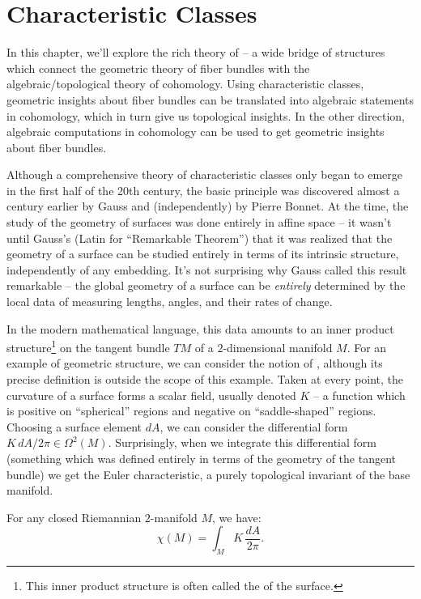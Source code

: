 \chapter{Characteristic Classes}\label{chapter:characteristic_classes}

In this chapter, we'll explore the rich theory of  -- a wide bridge of structures which connect the geometric theory of fiber bundles with the algebraic/topological theory of cohomology.
Using characteristic classes, geometric insights about fiber bundles can be translated into algebraic statements in cohomology, which in turn give us topological insights. In the other direction, algebraic computations in cohomology can be used to get geometric insights about fiber bundles.

Although a comprehensive theory of characteristic classes only began to emerge in the first half of the 20th century, the basic principle was discovered almost a century earlier by Gauss and (independently) by Pierre Bonnet. At the time, the study of the geometry of surfaces was done entirely in affine space -- it wasn't until Gauss's  (Latin for ``Remarkable Theorem'') that it was realized that the geometry of a surface can be studied entirely in terms of its intrinsic structure, independently of any embedding.
It's not surprising why Gauss called this result remarkable -- the global geometry of a surface can be \emph{entirely} determined by the local data of measuring lengths, angles, and their rates of change.

In the modern mathematical language, this data amounts to an inner product structure\footnote{This inner product structure is often called the  of the surface.} on the tangent bundle $TM$ of a $2$-dimensional manifold $M$. For an example of geometric structure, we can consider the notion of , although its precise definition is outside the scope of this example.
Taken at every point, the curvature of a surface forms a scalar field, usually denoted $K$ -- a function which is positive on ``spherical'' regions and negative on ``saddle-shaped'' regions. Choosing a surface element $dA$, we can consider the differential form $ K\,dA/2\pi \in \Omega^2(M).$
Surprisingly, when we integrate this differential form (something which was defined entirely in terms of the geometry of the tangent bundle) we get the Euler characteristic, a purely topological invariant of the base manifold.

\begin{theorem}\label{thm:gauss_bonnet} For any closed Riemannian $2$-manifold $M$, we have:\[\chi(M) = \int_M K\, \frac{dA}{2\pi}.\]
\end{theorem}

